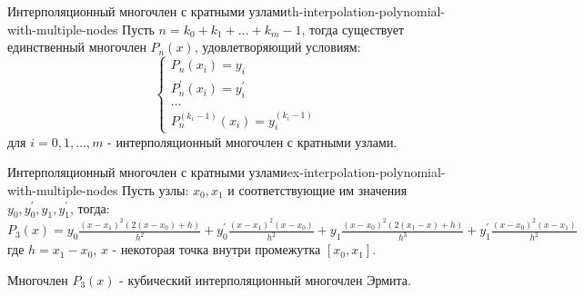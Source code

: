 \documentclass[14pt]{extarticle}
\begin{document}
    \begin{definition}{Интерполяционный многочлен с кратными узлами}{th-interpolation-polynomial-with-multiple-nodes}
        Пусть $n = k_{0} + k_{1} + \ldots + k_{m} - 1$, тогда существует единственный многочлен $P_{n}(x)$, удовлетворяющий условиям:
        $$
        \begin{cases}
            P_{n}(x_{i}) = y_{i}\\
            P_{n}^{'}(x_{i}) = y_{i}^{'}\\
            \ldots\\
            P_{n}^{(k_{i} - 1)}(x_{i}) = y_{i}^{(k_{i} - 1)}
        \end{cases}
        $$
        для $i = 0, 1, \ldots, m$ - интерполяционный многочлен с кратными узлами.
    \end{definition}

    \begin{example}{Интерполяционный многочлен с кратными узлами}{ex-interpolation-polynomial-with-multiple-nodes}
        Пусть узлы: $x_{0}, x_{1}$ и соответствующие им значения $y_{0}, y_{0}^{'}, y_{1}, y_{1}^{'}$, тогда:\\
        $P_{3}(x) = y_{0}\frac{(x - x_{1})^{2}(2(x - x_{0}) + h)}{h^{2}} + y_{0}^{'}\frac{(x - x_{1})^{2}(x - x_{0})}{h^{2}} + y_{1}\frac{(x - x_{0})^{2}(2(x_{1} - x)+h)}{h^{3}} + y_{1}^{'}\frac{(x - x_{0})^{2}(x-x_{1})}{h^{2}}$\\
        где $h = x_{1} - x_{0}$, $x$ - некоторая точка внутри промежутка $[x_{0}, x_{1}]$.

        \vspace{\baselineskip}

        Многочлен $P_{3}(x)$ - кубический интерполяционный многочлен Эрмита.
    \end{example}
\end{document}
